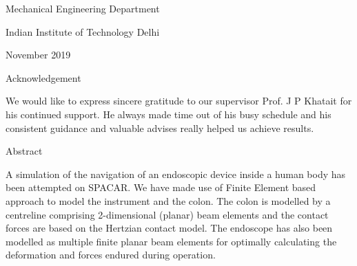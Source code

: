 \documentclass[12pt]{report}
\begin{document}

\par


\vspace{\baselineskip}
\begin{Center}
Mechanical Engineering Department
\end{Center}\par

\begin{Center}
Indian Institute of Technology Delhi
\end{Center}\par

\begin{Center}
November 2019
\end{Center}\par




\newpage

\vspace{\baselineskip}\begin{Center}
{\fontsize{16pt}{19.2pt}\selectfont Acknowledgement\par}
\end{Center}\par

We would like to express sincere gratitude to our supervisor Prof. J P Khatait for his continued support. He always made time out of his busy schedule and his consistent guidance and valuable advises really helped us achieve results.\par


\vspace{\baselineskip}
\begin{Center}
{\fontsize{16pt}{19.2pt}\selectfont Abstract\par}
\end{Center}\par

A simulation of the navigation of an endoscopic device inside a human body has been attempted on SPACAR. We have made use of Finite Element based approach to model the instrument and the colon. The colon is modelled by a centreline comprising 2-dimensional (planar) beam elements and the contact forces are based on the Hertzian contact model. The endoscope has also been modelled as multiple finite planar beam elements for optimally calculating the deformation and forces endured during operation.\par
\end{document}
